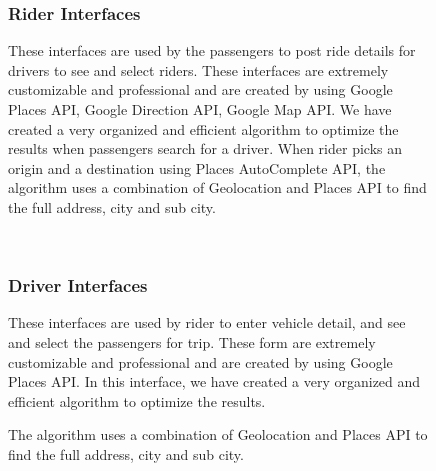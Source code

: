 \begin{figure} 
\subsubsection{Rider Interfaces}
These interfaces are used by the passengers to post ride details for drivers to see and select riders. These interfaces are extremely customizable and professional and are created by using Google Places API, Google Direction API, Google Map API. We have created a very organized and efficient algorithm to optimize the results when passengers search for a driver. When rider picks an origin and a destination using Places AutoComplete API, the algorithm uses a combination of Geolocation and Places API to find the full address, city and sub city.

\hspace*{\fill}
\hfill 
{}\\
\hspace*{\fill}
\hfill 
{}
\hspace*{\fill}
\end{figure}

\begin{figure}
\subsubsection{Driver Interfaces}
These interfaces are used by rider to enter vehicle detail, and see and select the passengers for trip. These form are extremely customizable and professional and are created by using Google Places API. In this interface, we have created a very organized and efficient algorithm to optimize the results.

\hspace*{\fill}
\hfill 
{}
\hspace*{\fill}

The algorithm uses a combination of Geolocation and Places API to find the full address, city and sub city.

\end{figure}

\begin{figure}
\hspace*{\fill}
\hfill 
{}\\
\hspace*{\fill}
\hfill 
{}\hfill
{}
\end{figure}